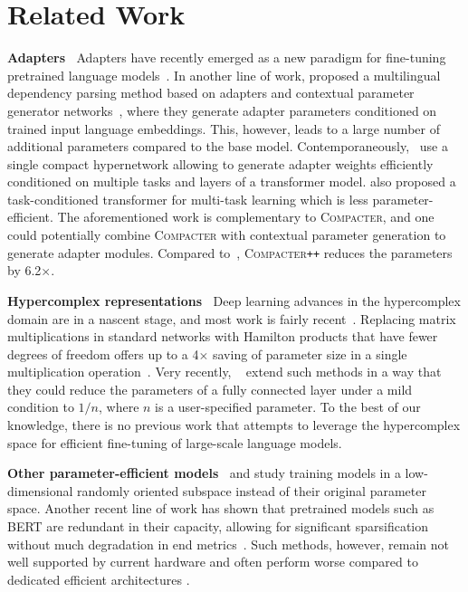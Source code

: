 \section{Related Work}
 \textbf{Adapters} $\:$ Adapters have recently emerged as a new paradigm for fine-tuning pretrained language models~\citep{houlsby2019parameter}. In another line of work, \citet{ustun2020udapter} proposed a multilingual dependency parsing method based on adapters and contextual parameter generator networks~\citep{platanios2018contextual}, where they generate adapter parameters conditioned on trained input language embeddings. This, however, leads to a large number of additional parameters compared to the base model. Contemporaneously,~\citet{karimi2021parameter-efficient}  use a single compact hypernetwork allowing to generate adapter weights efficiently conditioned on multiple tasks and layers of a transformer model. \citet{pilault2021conditionally} also proposed a task-conditioned transformer for multi-task learning which is less parameter-efficient. The aforementioned work is complementary to \textsc{Compacter}, and one could potentially combine \textsc{Compacter} with contextual parameter generation to generate adapter modules. Compared to~\citet{karimi2021parameter-efficient}, \textsc{Compacter}\texttt{++} reduces the parameters by 6.2$\times$. 

 \textbf{Hypercomplex representations} $\:$ Deep learning advances in the hypercomplex domain are in a nascent stage, and most work is fairly recent~\citep{gaudet2018deep, parcollet2018quaternion, parcollet2018quaternion_b, zhu2018quaternion, tay2019lightweight}. Replacing matrix multiplications in standard networks with Hamilton products that have fewer degrees of freedom offers up to a 4$\times$ saving of parameter size in a single multiplication operation~\citep{parcollet2018quaternion_b, tay2019lightweight}. Very recently, ~\citet{zhang2021beyond} extend such methods in a way that they could reduce the parameters of a fully connected layer under a mild condition to $1/n$, where $n$ is a user-specified parameter. To the best of our knowledge, there is no previous work that attempts to leverage the hypercomplex space for efficient fine-tuning of large-scale language models.

 \textbf{Other parameter-efficient models} $\:$ \citet{li2018measuring} and \citet{aghajanyan2020intrinsic} study training models in  a low-dimensional randomly oriented subspace instead of their original parameter space. Another recent line of work has shown that pretrained models such as BERT are redundant in their capacity, allowing for significant sparsification without much degradation in end metrics~\citep{chen2020lottery, prasannaetal2020bert, desaietal2019evaluating}. Such methods, however, remain not well supported by current hardware and often perform worse compared to dedicated efficient architectures \citep{blalock2020state}.

